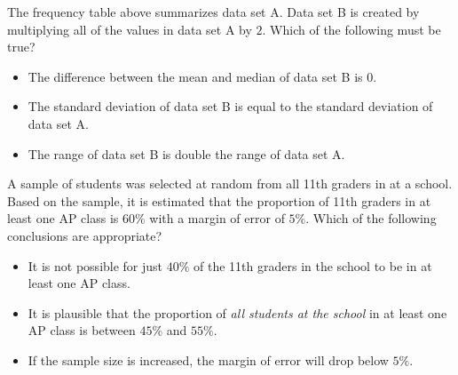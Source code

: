 The frequency table above summarizes data set A. 
Data set B is created by multiplying all of the values in data set A by $2$. 
Which of the following must be true?

\begin{itemize}
\item[I.] The difference between the mean and median of data set B is $0$.
\item[II.] The standard deviation of data set B is equal to the standard deviation of data set A.
\item[III.] The range of data set B is double the range of data set A.
\end{itemize}

\vspace{0.75em}

\newpage

\newpage

\noindent\markforreview
\vspace{1em}

\vspace{1em}

A sample of students was selected at random from all 11th graders in at a school. 
Based on the sample, it is estimated that the proportion of 11th graders in at least one AP class is $60\%$ with a margin of error of $5\%$. 
Which of the following conclusions are appropriate?

\begin{itemize}
\item[I.] It is not possible for just $40\%$ of the 11th graders in the school to be in at least one AP class.
\item[II.] It is plausible that the proportion of \emph{all students at the school} in at least one AP class is between $45\%$ and $55\%$.
\item[III.] If the sample size is increased, the margin of error will drop below $5\%$.
\end{itemize}

\vspace{0.75em}

